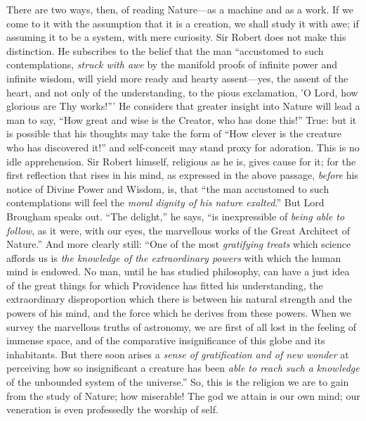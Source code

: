 There are two ways, then, of reading Nature—as a machine and as a
work. If we come to it with the assumption that it is a creation, we
shall study it with awe; if assuming it to be a system, with mere
curiosity. Sir Robert does not make this distinction. He subscribes to
the belief that the man ``accustomed to such contemplations, \emph{struck
with awe} by the manifold proofs of infinite power and infinite
wisdom, will yield more ready and hearty assent—yes, the assent of
the heart, and not only of the understanding, to the pious
exclamation, 'O Lord, how glorious are Thy works!''' He
considers that greater insight into Nature will lead a man to say,
``How great and wise is the Creator, who has done this!''
True: but it is possible that his thoughts may take the form of
``How clever is the creature who has discovered it!'' and
self-conceit may stand proxy for adoration. This is no idle
apprehension. Sir Robert himself, religious as he is, gives cause for
it; for the first reflection that rises in his mind, as expressed in
the above passage, \emph{before} his notice of Divine Power and
Wisdom, is, that ``the man accustomed to such contemplations will
feel the \emph{moral dignity of his nature exalted}.'' But Lord
Brougham speaks out. ``The delight,'' he says, ``is
inexpressible of \emph{being able to follow}, as it were, with our
eyes, the marvellous works of the Great Architect of Nature.'' And
more clearly still: ``One of the most \emph{gratifying treats}
which science affords us is \emph{the knowledge of the extraordinary
powers} with which the human mind is endowed. No man, until he has
studied philosophy, can have a just idea of the great things for which
Providence has fitted his understanding, the extraordinary
disproportion which there is between his natural strength and the
powers of his mind, and the force which he derives from these powers.
When we survey the marvellous truths of astronomy, we are first of all
lost in the feeling of immense space, and of the comparative
insignificance of this globe and its inhabitants. But there soon
arises a \emph{sense of gratification and of new wonder} at perceiving
how so insignificant a creature has been \emph{able to reach such a
knowledge} of the unbounded system of the universe.'' So, this
is the religion we are to gain from the study of Nature; how
miserable! The god we attain is our own mind; our veneration is even
professedly the worship of self.

